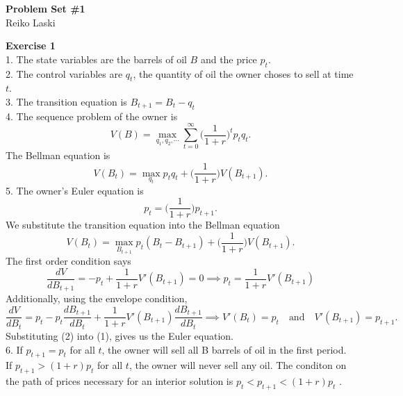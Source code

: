 \documentclass[letterpaper,12pt]{article}
\theoremstyle{definition}
\begin{document}
\begin{flushleft}
  \textbf{\large{Problem Set \#1}} \\
  Reiko Laski
\end{flushleft}

\vspace{3mm}

\textbf{Exercise 1} \\
1. The state variables are the barrels of oil $B$ and the price $p_{t}$. \\
2. The control variables are $q_t$, the quantity of oil the owner choses to sell at time $t$. \\
3. The transition equation is $B_{t+1} = B_t - q_t$ \\
4. The sequence problem of the owner is
\begin{equation*}
  V(B) = \max_{q_1, q_2, \cdots} \sum_{t=0}^\infty  \Big(\frac{1}{1 + r} \Big)^t p_t q_t .
\end{equation*}
The Bellman equation is
\begin{equation*}
  V(B_t) = \max_{q_t} p_t q_t + \Big(\frac{1}{1 + r}\Big) V(B_{t+1}) .
\end{equation*}
5. The owner's Euler equation is
\begin{equation*}
  p_t = \Big(\frac{1}{1 + r}\Big) p_{t+1}.
\end{equation*}
We substitute the transition equation into the Bellman equation
\begin{equation*}
  V(B_t) = \max_{B_{t+1}} p_t (B_t - B_{t+1}) + \Big(\frac{1}{1+r}\Big) V(B_{t+1}).
\end{equation*}
The first order condition says
\begin{equation}
  \frac{dV}{d B_{t+1} } = -p_t + \frac{1}{1+r} V'(B_{t+1}) = 0
  \implies p_t = \frac{1}{1+r} V'(B_{t+1})
\end{equation}
Additionally, using the envelope condition,
\begin{equation}
  \frac{dV}{dB_t} = p_t - p_t \frac{dB_{t+1}}{dB_t} + \frac{1}{1+r} V'(B_{t+1}) \frac{dB_{t+1}}{dB_t} \implies V'(B_t) = p_t \quad \text{and} \quad V'(B_{t+1}) = p_{t+1} .
\end{equation}
Substituting (2) into (1), gives us the Euler equation. \\
6. If $p_{t+1} = p_t$ for all $t$, the owner will sell all B barrels of oil in the first period. If $p_{t+1} > (1 + r)p_t$ for all $t$, the owner will never sell any oil. The conditon on the path of prices necessary for an interior solution is $p_t < p_{t+1} < (1 + r)p_t$ .
\end{document}
